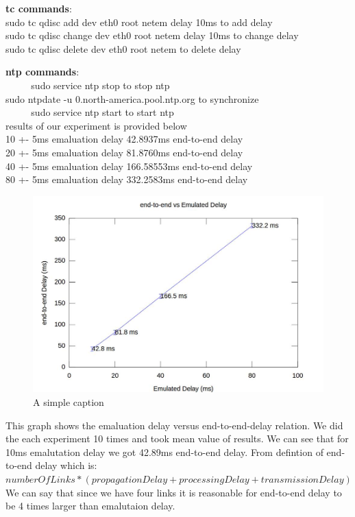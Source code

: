 \documentclass[12pt]{article}
\begin{document}
\textbf{tc commands}:
\\ sudo tc qdisc add dev eth0 root netem delay 10ms   \quad\quad to add delay
\\ sudo tc qdisc change dev eth0 root netem delay 10ms \quad\quad to change delay
\\ sudo tc qdisc delete dev eth0 root netem \quad\quad\quad\quad\quad\quad\quad to delete delay

\textbf{ntp commands}:\\
$\quad $ $\quad $ sudo service ntp stop \quad\quad\quad \quad \quad \quad to stop ntp\\ 
sudo ntpdate -u 0.north-america.pool.ntp.org \quad to synchronize\\
$\quad $ $\quad $ sudo service ntp start \quad\quad\quad \quad \quad \quad to start ntp\\

results of our experiment is provided below\\
10 +- 5ms emaluation delay 42.8937ms end-to-end delay
\\20 +- 5ms emaluation delay 81.8760ms end-to-end delay
\\40 +- 5ms emaluation delay 166.58553ms end-to-end delay
\\80 +- 5ms emaluation delay 332.2583ms end-to-end delay




\begin{figure}[H]
\centering
\includegraphics[width=140mm]{graph.jpeg}
\caption{A simple caption \label{overflow}}
\end{figure}

This graph shows the emaluation delay versus end-to-end-delay relation. We did the each experiment 10 times and took mean value of results. We can see that for 10ms emalutation delay we got 42.89ms end-to-end delay. From defintion of end-to-end delay which is:\\
 $ numberOfLinks *(propagationDelay+processingDelay+transmissionDelay)$
We can say that since we have four links it is reasonable for end-to-end delay to be 4 times larger than emalutaion delay.
\end{document}
